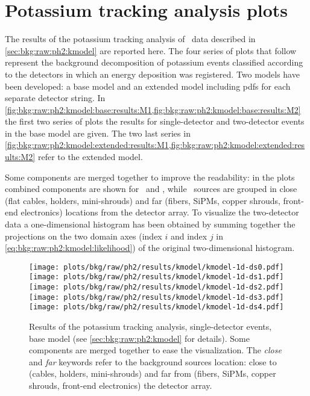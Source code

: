 
\chapter{Potassium tracking analysis plots}%
\label{apdx:kmodelplots}

The results of the potassium tracking analysis of \gerdatwo\ data described in
\cref{sec:bkg:raw:ph2:kmodel} are reported here. The four series of plots that follow
represent the background decomposition of potassium events classified according to the
detectors in which an energy deposition was registered. Two models have been developed: a
base model and an extended model including pdfs for each separate detector string.  In
\cref{fig:bkg:raw:ph2:kmodel:base:results:M1,fig:bkg:raw:ph2:kmodel:base:results:M2} the
first two series of plots the results for single-detector and two-detector events in the
base model are given. The two last series in
\cref{fig:bkg:raw:ph2:kmodel:extended:results:M1,fig:bkg:raw:ph2:kmodel:extended:results:M2}
refer to the extended model.

Some components are merged together to improve the readability: in the  plots
combined components are shown for \kvz\ and \Bih, while \kvn\ sources are grouped in close
(flat cables, holders, mini-shrouds) and far (fibers, SiPMs, copper shrouds, front-end
electronics) locations from the detector array. To visualize the two-detector data a
one-dimensional histogram has been obtained by summing together the projections on the two
domain axes (index $i$ and index $j$ in \cref{eq:bkg:raw:ph2:kmodel:likelihood}) of the
original two-dimensional histogram.

\begin{figure}
  \centering
  \texttt{[image: plots/bkg/raw/ph2/results/kmodel/kmodel-1d-ds0.pdf]}
  \texttt{[image: plots/bkg/raw/ph2/results/kmodel/kmodel-1d-ds1.pdf]}\vspace{10pt}
  \texttt{[image: plots/bkg/raw/ph2/results/kmodel/kmodel-1d-ds2.pdf]}
  \texttt{[image: plots/bkg/raw/ph2/results/kmodel/kmodel-1d-ds3.pdf]}\vspace{10pt}
  \texttt{[image: plots/bkg/raw/ph2/results/kmodel/kmodel-1d-ds4.pdf]}
  \begin{minipage}[b][5.3cm][c]{0.45\textwidth}
    \hspace{15pt}%
    \parbox{0.91\textwidth}{%
      \caption{%
        Results of the potassium tracking analysis, single-detector events, base model (see
        \cref{sec:bkg:raw:ph2:kmodel} for details). Some components are merged together to
        ease the visualization. The \emph{close} and \emph{far} keywords refer to the
        background sources location: close to (cables, holders, mini-shrouds) and far from
        (fibers, SiPMs, copper shrouds, front-end electronics) the detector array.
      }\label{fig:bkg:raw:ph2:kmodel:base:results:M1}
    }
  \end{minipage}
\end{figure}

